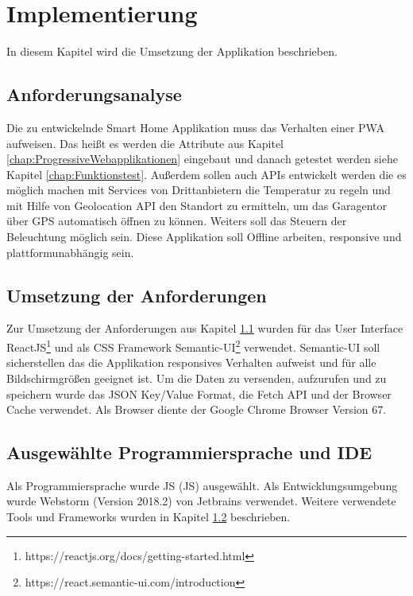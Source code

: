 \chapter{Implementierung}\label{chap:Implementierung}
\thispagestyle{standard}
\pagestyle{standard}

In diesem Kapitel wird die Umsetzung der Applikation beschrieben.

\section{Anforderungsanalyse}\label{sub:Anforderungsanalyse}
Die zu entwickelnde Smart Home Applikation muss das Verhalten einer \acs{PWA} aufweisen. Das heißt es werden die Attribute aus Kapitel \ref{chap:ProgressiveWebapplikationen} eingebaut und danach getestet werden siehe Kapitel \ref{chap:Funktionstest}. Außerdem sollen auch APIs entwickelt werden die es möglich machen mit Services von Drittanbietern die Temperatur zu regeln und mit Hilfe von Geolocation API den Standort zu ermitteln, um das Garagentor über GPS automatisch öffnen zu können. Weiters soll das Steuern der Beleuchtung möglich sein. Diese Applikation soll Offline arbeiten, responsive und plattformunabhängig sein.

\section{Umsetzung der Anforderungen}\label{sub:Umsetzung der Anforderungen}
Zur Umsetzung der Anforderungen aus Kapitel \ref{sub:Anforderungsanalyse} wurden für das User Interface ReactJS\footnote{https://reactjs.org/docs/getting-started.html} und als CSS Framework Semantic-UI\footnote{https://react.semantic-ui.com/introduction} verwendet. Semantic-UI soll sicherstellen das die Applikation responsives Verhalten aufweist und für alle Bildschirmgrößen geeignet ist. Um die Daten zu versenden, aufzurufen und zu speichern wurde das JSON Key/Value Format, die Fetch API und der Browser Cache verwendet.
Als Browser diente der Google Chrome Browser Version 67.

\section{Ausgewählte Programmiersprache und IDE}
Als Programmiersprache wurde \acl{JS} (\acs{JS}) ausgewählt. 
Als Entwicklungsumgebung wurde Webstorm (Version 2018.2) von Jetbrains verwendet. 
Weitere verwendete Tools und Frameworks wurden in Kapitel \ref{sub:Umsetzung der Anforderungen} beschrieben.
\newpage

